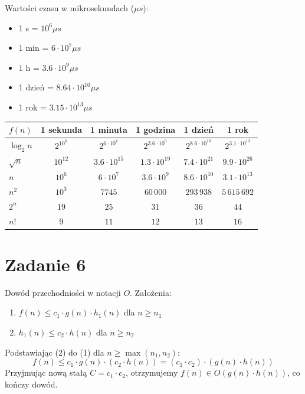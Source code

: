 \documentclass{article}
\begin{document}
Wartości czasu w mikrosekundach ($\mu s$):
\begin{itemize}
    \item 1 s = $10^6 \mu s$
    \item 1 min = $6 \cdot 10^7 \mu s$
    \item 1 h = $3.6 \cdot 10^9 \mu s$
    \item 1 dzień = $8.64 \cdot 10^{10} \mu s$
    \item 1 rok = $3.15 \cdot 10^{13} \mu s$
\end{itemize}

\begin{table}[h]
\centering
\begin{tabular}{|l|c|c|c|c|c|}
\hline
$f(n)$ & 1 sekunda & 1 minuta & 1 godzina & 1 dzień & 1 rok \\ \hline
$\log_2 n$ & $2^{10^6}$ & $2^{6 \cdot 10^7}$ & $2^{3.6 \cdot 10^9}$ & $2^{8.6 \cdot 10^{10}}$ & $2^{3.1 \cdot 10^{13}}$ \\ \hline
$\sqrt{n}$ & $10^{12}$ & $3.6 \cdot 10^{15}$ & $1.3 \cdot 10^{19}$ & $7.4 \cdot 10^{21}$ & $9.9 \cdot 10^{26}$ \\ \hline
$n$ & $10^6$ & $6 \cdot 10^7$ & $3.6 \cdot 10^9$ & $8.6 \cdot 10^{10}$ & $3.1 \cdot 10^{13}$ \\ \hline
$n^2$ & $10^3$ & $7745$ & $60\,000$ & $293\,938$ & $5\,615\,692$ \\ \hline
$2^n$ & $19$ & $25$ & $31$ & $36$ & $44$ \\ \hline
$n!$ & $9$ & $11$ & $12$ & $13$ & $16$ \\ \hline
\end{tabular}
\end{table}

\section{Zadanie 6}
Dowód przechodniości w notacji $O$.
Założenia:
\begin{enumerate}
    \item $f(n) \le c_1 \cdot g(n) \cdot h_1(n)$ dla $n \ge n_1$
    \item $h_1(n) \le c_2 \cdot h(n)$ dla $n \ge n_2$
\end{enumerate}
Podstawiając (2) do (1) dla $n \ge \max(n_1, n_2)$:
\[ f(n) \le c_1 \cdot g(n) \cdot (c_2 \cdot h(n)) = (c_1 \cdot c_2) \cdot (g(n) \cdot h(n)) \]
Przyjmując nową stałą $C = c_1 \cdot c_2$, otrzymujemy $f(n) \in O(g(n) \cdot h(n))$, co kończy dowód.
\end{document}
